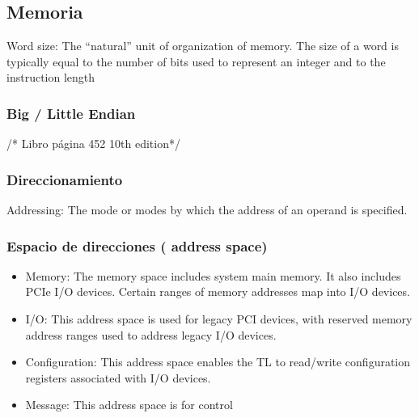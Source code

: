 \subsection{Memoria}
Word size: The “natural” unit of organization of memory. The size of a word is typically equal to the number of bits used to represent an integer and to the instruction length
\subsubsection{Big / Little Endian}
/* Libro página 452 10th edition*/
\subsubsection{Direccionamiento}
Addressing: The mode or modes by which the address of an operand is specified.
\subsubsection{Espacio de direcciones ( address space)}
\begin{itemize}
\item Memory: The memory space includes system main memory. It also includes PCIe I/O devices. Certain ranges of memory addresses map into I/O devices.
\item I/O: This address space is used for legacy PCI devices, with reserved memory address ranges used to address legacy I/O devices.
\item Configuration: This address space enables the TL to read/write configuration registers associated with I/O devices.
\item Message: This address space is for control
\end{itemize}


